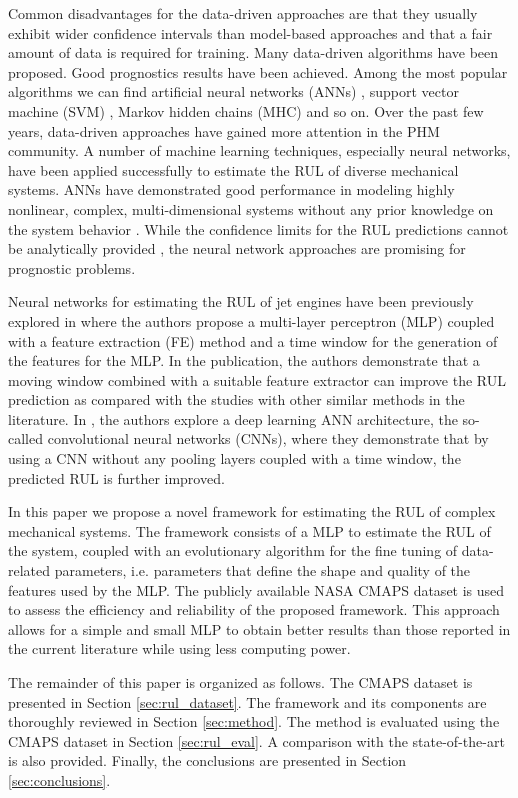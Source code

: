 \documentclass[12pt]{IEEEtran}%
\begin{document}
Common disadvantages for the data-driven approaches are that they usually
exhibit wider confidence intervals than model-based approaches and that a fair
amount of data is required for training. Many data-driven algorithms have been
proposed. Good prognostics results have been achieved. Among the most popular
algorithms we can find artificial neural networks (ANNs) \cite{Gebraeel2004},
support vector machine (SVM) \cite{Benkedjouh2013}, Markov hidden chains (MHC)
\cite{Dong2007} and so on. Over the past few years, data-driven approaches
have gained more attention in the PHM community. A number of machine learning
techniques, especially neural networks, have been applied successfully to
estimate the RUL of diverse mechanical systems. ANNs have demonstrated good
performance in modeling highly nonlinear, complex, multi-dimensional systems
without any prior knowledge on the system behavior \cite{Li2018}. While the
confidence limits for the RUL predictions cannot be analytically provided
\cite{Sikorska2011}, the neural network approaches are promising for
prognostic problems.

Neural networks for estimating the RUL of jet engines have been previously
explored in \cite{Lim2016} where the authors propose a multi-layer perceptron
(MLP) coupled with a feature extraction (FE) method and a time window for the
generation of the features for the MLP. In the publication, the authors
demonstrate that a moving window combined with a suitable feature extractor
can improve the RUL prediction as compared with the studies with other similar
methods in the literature. In \cite{Li2018}, the authors explore a deep
learning ANN architecture, the so-called convolutional neural networks (CNNs),
where they demonstrate that by using a CNN without any pooling layers coupled
with a time window, the predicted RUL is further improved.

In this paper we propose a novel framework for estimating the RUL of complex
mechanical systems. The framework consists of a MLP to estimate the RUL of the
system, coupled with an evolutionary algorithm for the fine tuning of
data-related parameters, i.e. parameters that define the shape and quality of
the features used by the MLP. The publicly available NASA CMAPS dataset
\cite{CMAPS2008} is used to assess the efficiency and reliability of the
proposed framework. This approach allows for a simple and small MLP to obtain
better results than those reported in the current literature while using less
computing power.

The remainder of this paper is organized as follows. The CMAPS dataset is
presented in Section \ref{sec:rul_dataset}. The framework and its components
are thoroughly reviewed in Section \ref{sec:method}. The method is evaluated
using the CMAPS dataset in Section \ref{sec:rul_eval}. A comparison with the
state-of-the-art is also provided. Finally, the conclusions are presented in
Section \ref{sec:conclusions}.
\end{document}
